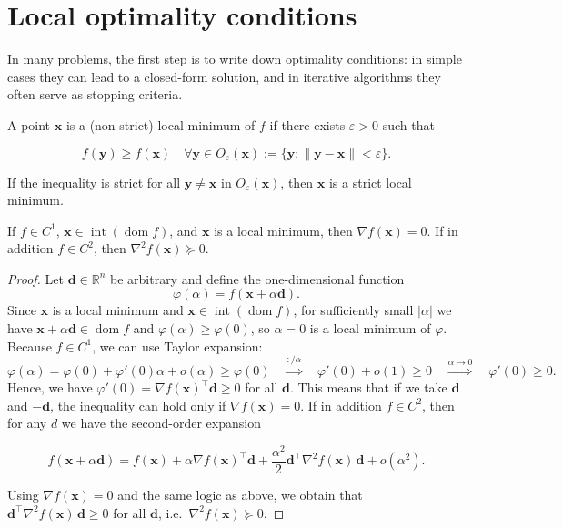 \section{Local optimality conditions}
In many problems, the first step is to write down optimality 
conditions: in simple cases they can lead to a closed-form solution, 
and in iterative algorithms they often serve as stopping criteria.

\begin{definition}
A point $\mathbf{x}$ is a (non-strict) local minimum of $f$ if there exists
$\varepsilon>0$ such that

\[
  f(\mathbf{y})\ge f(\mathbf{x})\quad \forall \mathbf{y}\in
  O_\varepsilon(\mathbf{x}):=\{\mathbf{y}:\|\mathbf{y}-\mathbf{x}\|<\varepsilon\}.
\]

If the inequality is strict for all $\mathbf{y}\neq \mathbf{x}$ in
$O_\varepsilon(\mathbf{x})$, then $\mathbf{x}$ is a strict local minimum.
\end{definition}


\begin{claim}
If $f \in C^{1}$, $\mathbf{x} \in \operatorname{int}(\operatorname{dom} f)$,
and $\mathbf{x}$ is a local minimum, then $\nabla f(\mathbf{x})=0$. If in
addition $f \in C^{2}$, then $\nabla^{2} f(\mathbf{x}) \succeq 0$.
\end{claim}
\begin{proof}
Let $\mathbf{d}\in\mathbb{R}^n$ be arbitrary and define the one-dimensional function
\[
  \varphi(\alpha)=f(\mathbf{x}+\alpha \mathbf{d}).
\]
Since $\mathbf{x}$ is a local minimum and $\mathbf{x}\in \operatorname{int}
(\operatorname{dom} f)$, for sufficiently small $|\alpha|$ we have
$\mathbf{x}+\alpha \mathbf{d}\in \operatorname{dom} f$ and $\varphi(\alpha)\ge \varphi(0)$,
so $\alpha=0$ is a local minimum of $\varphi$.
Because $f\in C^1$, we can use Taylor expansion:
\[
\varphi(\alpha) = \varphi(0) + \varphi'(0)\alpha + o(\alpha) \ge \varphi(0)
\quad \overset{:/\alpha}{\Longrightarrow}\quad \varphi'(0)+o(1)\ge 0
\quad \overset{\alpha\to 0}{\Longrightarrow}\quad \varphi'(0)\ge 0.
\]
Hence, we have $\varphi'(0) = \nabla f(\mathbf{x})^{\top} \mathbf{d} \ge 0$ for all $\mathbf{d}$.
This means that if we take $\mathbf{d}$ and $-\mathbf{d}$, the inequality can hold only if
$\nabla f(\mathbf{x}) = 0$.
If in addition $f\in C^2$, then for any $d$ we have the second-order 
expansion

\[
  f(\mathbf{x}+\alpha \mathbf{d})=f(\mathbf{x})+\alpha\nabla f(\mathbf{x})^\top \mathbf{d}
  +\frac{\alpha^2}{2}\mathbf{d}^\top\nabla^2 f(\mathbf{x})\,\mathbf{d}+o(\alpha^2).
\]

Using $\nabla f(\mathbf{x})=0$ and the same logic as above, we obtain that
$\mathbf{d}^\top\nabla^2 f(\mathbf{x})\,\mathbf{d}\ge 0$ for all $\mathbf{d}$,
i.e.\ $\nabla^2 f(\mathbf{x})\succeq 0$.
\end{proof}

